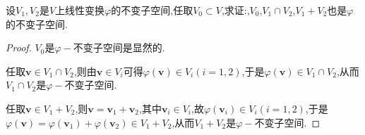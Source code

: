 \documentclass[../../main.tex]{subfiles}%
\begin{document}
\begin{proposition}\label{proposition:不变子空间的子空间、交与和仍是不变子空间}
设\(V_1,V_2\)是\(V\)上线性变换\(\varphi\)的不变子空间,任取$V_0\subset V$,求证:,$V_0$,\(V_1\cap V_2\),\(V_1 + V_2\)也是\(\varphi\)的不变子空间.
\end{proposition}
\begin{proof}

$V_0$是\(\varphi -\)不变子空间是显然的.

任取\(\boldsymbol{v}\in V_1\cap V_2\),则由\(\boldsymbol{v}\in V_i\)可得\(\varphi(\boldsymbol{v})\in V_i(i = 1,2)\),于是\(\varphi(\boldsymbol{v})\in V_1\cap V_2\),从而\(V_1\cap V_2\)是\(\varphi -\)不变子空间.

任取\(\boldsymbol{v}\in V_1 + V_2\),则\(\boldsymbol{v}=\boldsymbol{v}_1+\boldsymbol{v}_2\),其中\(\boldsymbol{v}_i\in V_i\),故\(\varphi(\boldsymbol{v}_i)\in V_i(i = 1,2)\),于是\(\varphi(\boldsymbol{v})=\varphi(\boldsymbol{v}_1)+\varphi(\boldsymbol{v}_2)\in V_1 + V_2\),从而\(V_1 + V_2\)是\(\varphi -\)不变子空间.

\end{proof}
\end{document}
